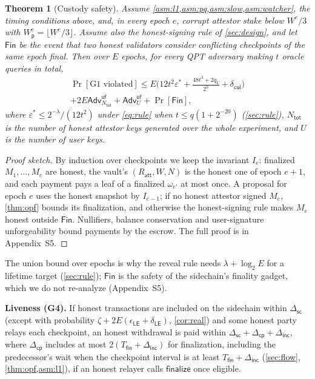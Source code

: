 \documentclass[10pt,journal,compsoc]{IEEEtran}
\theoremstyle{tplain}
\newtheorem{theorem}{Theorem}
\theoremstyle{tdef}
\theoremstyle{remark}
\newcommand{\supp}[1]{Appendix~#1}
\newcommand{\Adv}{\mathsf{Adv}}
\newcommand{\Wp}{W_{\mathsf{p}}}
\newcommand{\Ratt}{R_{\mathsf{att}}}
\begin{document}
\begin{theorem}[Custody safety]\label{thm:e2e}
Assume \cref{asm:l1,asm:pq,asm:slow,asm:watcher}, the timing conditions above, and, in every epoch $e$, corrupt attestor stake below $W^e/3$ with $\Wp^e=\lfloor W^e/3\rfloor$. Assume also the honest-signing rule of \cref{sec:design}, and let $\mathsf{Fin}$ be the event that two honest validators consider conflicting checkpoints of the same epoch final. Then over $E$ epochs, for every QPT adversary making $t$ oracle queries in total,
\begin{multline*}
\Pr[\text{G1 violated}]\le E\Big(12t^2\varepsilon^\ast+\frac{48t^3+2q_V}{2^h}+\delta_{\mathsf{col}}\Big)\\+2E\Adv^{\mathsf{uf}}_{N_{\mathsf{tot}}}+\Adv^{\mathsf{uf}}_{U}+\Pr[\mathsf{Fin}],
\end{multline*}
where $\varepsilon^\ast\le 2^{-\lambda}/(12t^2)$ under \cref{eq:rule} when $t\le q(1+2^{-20})$ (\cref{sec:rule}), $N_{\mathsf{tot}}$ is the number of honest attestor keys generated over the whole experiment, and $U$ is the number of user keys.
\end{theorem}
\begin{proof}[Proof sketch]
By induction over checkpoints we keep the invariant $I_e$: finalized $M_1,\dots,M_e$ are honest, the vault's $(\Ratt,W,N)$ is the honest one of epoch $e+1$, and each payment pays a leaf of a finalized $\omega_{e'}$ at most once. A proposal for epoch $e$ uses the honest snapshot by $I_{e-1}$; if no honest attestor signed $M_e$, \cref{thm:opf} bounds its finalization, and otherwise the honest-signing rule makes $M_e$ honest outside $\mathsf{Fin}$. Nullifiers, balance conservation and user-signature unforgeability bound payments by the escrow. The full proof is in \supp{S5}.
\end{proof}

\noindent The union bound over epochs is why the reveal rule needs $\lambda+\log_2E$ for a lifetime target (\cref{sec:rule}); $\mathsf{Fin}$ is the safety of the sidechain's finality gadget, which we do not re-analyze (\supp{S5}).

\noindent\textbf{Liveness (G4).} If honest transactions are included on the sidechain within $\Delta_{\mathsf{sc}}$ (except with probability $\zeta+2E(\epsilon_{\mathsf{LE}}+\delta_{\mathsf{LE}})$, \cref{cor:real}) and some honest party relays each checkpoint, an honest withdrawal is paid within $\Delta_{\mathsf{sc}}+\Delta_{\mathsf{cp}}+\Delta_{\mathsf{inc}}$, where $\Delta_{\mathsf{cp}}$ includes at most $2(T_{\mathsf{fin}}+\Delta_{\mathsf{inc}})$ for finalization, including the predecessor's wait when the checkpoint interval is at least $T_{\mathsf{fin}}+\Delta_{\mathsf{inc}}$ (\cref{sec:flow}, \cref{thm:opf,asm:l1}), if an honest relayer calls $\mathsf{finalize}$ once eligible.
\end{document}
